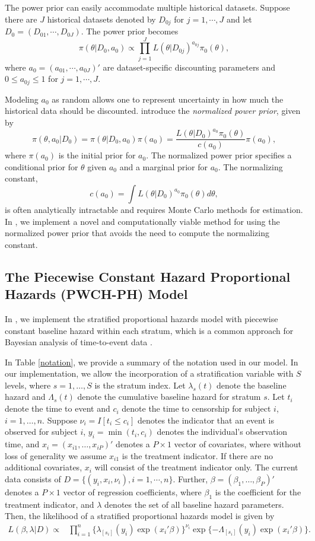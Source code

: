 The power prior can easily accommodate multiple historical datasets. Suppose there are $J$ historical datasets denoted by $D_{0j}$ for $j=1,\cdots, J$ and let $D_0=(D_{01}, \cdots, D_{0J})$. The power prior becomes $$\pi(\theta|D_0, a_0) \propto \prod_{j=1}^J L(\theta|D_{0j})^{a_{0j}}\pi_0(\theta),$$ where $a_0 = (a_{01},\cdots,a_{0J})'$ are dataset-specific discounting parameters and $0\le a_{0j} \le 1$ for $j=1,\cdots,J$.

Modeling $a_0$ as random allows one to represent uncertainty in how much the historical data should be discounted. \cite{duan_2006} introduce the \emph{normalized power prior}, given by $$\pi(\theta, a_0|D_0) = \pi(\theta|D_0, a_0)\pi(a_0) = \frac{L(\theta|D_0)^{a_0}\pi_0(\theta)}{c(a_0)}\pi(a_0),$$ where $\pi(a_0)$ is the initial prior for $a_0$. The normalized power prior specifies a conditional prior for $\theta$ given $a_0$ and a marginal prior for $a_0$. The normalizing constant, $$c(a_0)=\int L(\theta|D_0)^{a_0}\pi_0(\theta) d\theta,$$ is often analytically intractable and requires Monte Carlo methods for estimation. In  , we implement a novel and computationally viable method for using the normalized power prior that avoids the need to compute the normalizing constant.

\subsection{The Piecewise Constant Hazard Proportional Hazards (PWCH-PH) Model}
In , we implement the stratified proportional hazards model with piecewise
constant baseline hazard within each stratum, which is a common approach for Bayesian analysis of time-to-event data \citep{ibrahim_2001}. 

In Table \ref{notation}, we provide a summary of the notation used in our model. In our implementation, we allow the incorporation of a stratification variable with $S$ levels, where $s=1,\dots,S$ is the stratum index. Let $\lambda_s(t)$ denote the baseline hazard and $\Lambda_s(t)$ denote the cumulative baseline hazard for stratum $s$. Let $t_i$ denote the time to event and $c_i$ denote the time to censorship for subject $i$, $i=1,\dots,n$. Suppose $\nu_i=I[t_i \le c_i]$ denotes the indicator that an event is observed for subject $i$,  $y_i=\min(t_i, c_i)$ denotes the individual's observation time, and $x_i=(x_{i1},\dots,x_{iP})'$ denotes a $P \times 1$ vector of covariates, where without loss of generality we assume $x_{i1}$ is the treatment indicator. If there are no additional covariates, $x_i$ will consist of the treatment indicator only. The current data consists of $D = \{(y_{i}, x_{i}, \nu_{i}), i=1,\cdots, n\}$. Further, $\beta=(\beta_1,\dots,\beta_P)'$ denotes a $P \times 1$ vector of regression coefficients, where $\beta_1$ is the coefficient for the treatment indicator, and $\lambda$ denotes the set of all baseline hazard parameters. Then, the likelihood of a stratified proportional hazards model is given by
\begin{align*}
L(\beta,\lambda|D)\propto &\prod_{i=1}^n\{\lambda_{[s_i]}(y_i)\exp(x_i'\beta)\}^{\nu_i}\exp\{-\Lambda_{[s_i]}(y_i)\exp(x_i'\beta)\}.
\end{align*}

